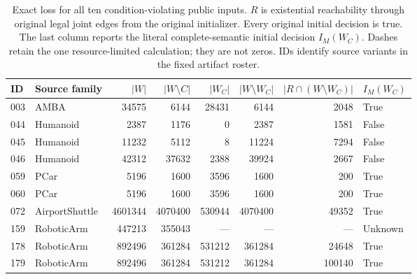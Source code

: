 \begin{table}[htbp]
\centering\small
\setlength{\tabcolsep}{4pt}
\caption{Exact loss for all ten condition-violating public inputs. $R$ is existential reachability through original legal joint edges from the original initializer. Every original initial decision is true. The last column reports the literal complete-semantic initial decision $I_M(W_C)$. Dashes retain the one resource-limited calculation; they are not zeros. IDs identify source variants in the fixed artifact roster.}
\label{tab:exact-public-loss}
\begin{tabular}{@{}llrrrrrl@{}}
\toprule
ID & Source family & $|W|$ & $|W\setminus C|$ & $|W_C|$ & $|W\setminus W_C|$ & $|R\cap(W\setminus W_C)|$ & $I_M(W_C)$\\
\midrule
003 & AMBA & 34575 & 6144 & 28431 & 6144 & 2048 & True\\
044 & Humanoid & 2387 & 1176 & 0 & 2387 & 1581 & False\\
045 & Humanoid & 11232 & 5112 & 8 & 11224 & 7294 & False\\
046 & Humanoid & 42312 & 37632 & 2388 & 39924 & 2667 & False\\
059 & PCar & 5196 & 1600 & 3596 & 1600 & 200 & True\\
060 & PCar & 5196 & 1600 & 3596 & 1600 & 200 & True\\
072 & AirportShuttle & 4601344 & 4070400 & 530944 & 4070400 & 49352 & True\\
159 & RoboticArm & 447213 & 355043 & --- & --- & --- & Unknown\\
178 & RoboticArm & 892496 & 361284 & 531212 & 361284 & 24648 & True\\
179 & RoboticArm & 892496 & 361284 & 531212 & 361284 & 100140 & True\\
\bottomrule
\end{tabular}
\end{table}
